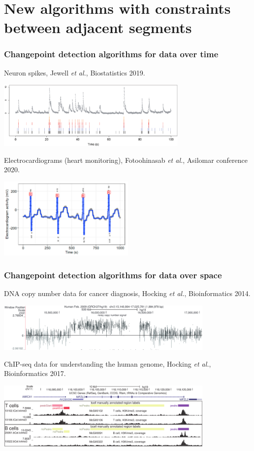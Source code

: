 \documentclass{beamer}
\begin{document}
\section{New algorithms with constraints between adjacent segments}
\begin{frame}
  \frametitle{Changepoint detection algorithms for data over time}
  Neuron spikes, Jewell \emph{et al.}, Biostatistics 2019.

  \includegraphics[width=0.7\textwidth]{intro-neuroscience} 

  Electrocardiograms (heart monitoring), 
  Fotoohinasab \emph{et al.}, 
  Asilomar conference 2020.

  \includegraphics[width=0.5\textwidth]{intro-ecg} 

\end{frame}

\begin{frame}
  \frametitle{Changepoint detection algorithms for data over space}

  DNA copy number data for cancer diagnosis, Hocking \emph{et
    al.}, Bioinformatics 2014.

  \includegraphics[width=0.8\textwidth]{intro-breakpoints}

  ChIP-seq data for understanding the human genome, Hocking 
  \emph{et al.}, Bioinformatics 2017.

  \includegraphics[width=0.8\textwidth]{intro-peaks}

\end{frame}
\end{document}
